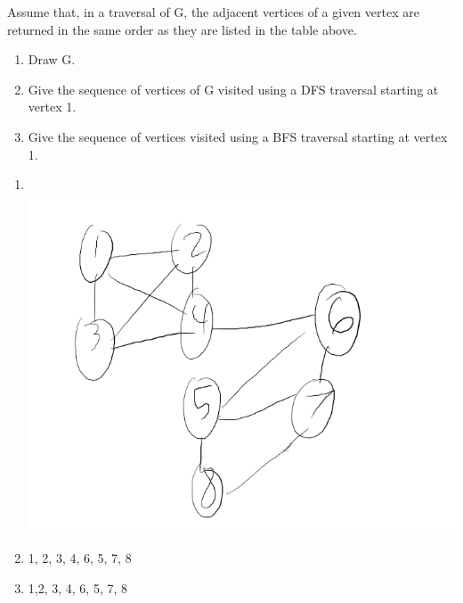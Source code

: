 \begin{itemize}
\begin{center}
            \end{center}
            Assume that, in a traversal of G, the adjacent vertices of a given vertex are
            returned in the same order as they are listed in the table above.
            \begin{enumerate}[label=\alph*.]
                  \item Draw G.
                  \item Give the sequence of vertices of G visited using a DFS traversal starting at vertex 1.
                  \item Give the sequence of vertices visited using a BFS traversal starting at vertex 1.
            \end{enumerate}
            \answer
            \begin{enumerate}[label =\alph*.]
                  \item \text{}\\
                        \includegraphics[scale=0.7]{img/R-13_7.png}
                  \item 1, 2, 3, 4, 6, 5, 7, 8
                  \item 1,2, 3, 4, 6, 5, 7, 8
            \end{enumerate}


\end{itemize}
